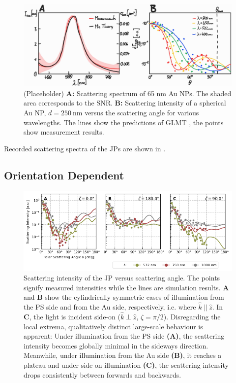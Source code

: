 \documentclass[10pt]{article}
\newcommand{\reffig}[2]{\mbox{\sffamily{Figure \ref{#1}#2}}}
\begin{document}
\begin{multicols}{2}
\begin{figure}[t]
    \centering
    \includegraphics[width=\textwidth]{[fig] AuNP (placeholder).jpg}
    \caption{(Placeholder) 
    {\sffamily\bfseries A:} Scattering spectrum of 65 nm Au NPs. The shaded area corresponds to the SNR. 
    {\sffamily\bfseries B:} Scattering intensity of a spherical Au NP, $d=\SI{250}{\nano\meter}$ versus the scattering angle for various wavelengths. The lines show the predictions of GLMT \cite{GouesbetGrehan}, the points show measurement results.
    }
    \label{fig:AuNP}
\end{figure}

Recorded scattering spectra of the JPs are shown in \reffig{fig:spectra}{B}.

\subsection*{Orientation Dependent}

\begin{figure}[t!]
    \centering
    \includegraphics[width=\textwidth]{[fig] cartesian mieplots (3, placeholder)}
    \caption{Scattering intensity of the JP versus scattering angle. 
    The points signify measured intensities while the lines are simulation results.  
    {\sffamily\bfseries A} and {\sffamily\bfseries B} show the cylindrically symmetric cases of illumination from the PS side and from the Au side, respectively, i.e. where $\hat{k}\parallel\hat{z}$. 
    In {\sffamily\bfseries C}, the light is incident side-on ($\hat{k}\perp\hat{z}$, $\zeta=\pi/2$). 
    Disregarding the local extrema, qualitatively distinct large-scale behaviour is apparent: Under illumination from the PS side {\sffamily\bfseries (A)}, the scattering intensity becomes globally minimal in the sideways direction. 
    Meanwhile, under illumination from the Au side {\sffamily\bfseries (B)}, it reaches a plateau and under side-on illumination {\sffamily\bfseries (C)}, the scattering intensity drops consistently between forwards and backwards.  
    }
    \label{fig:jp-mieplots-oneline}
\end{figure}


\end{multicols}
\end{document}
